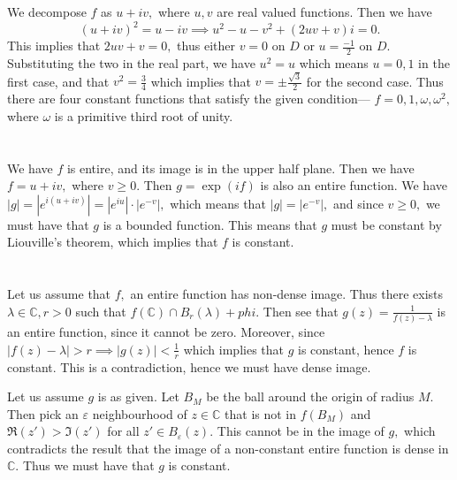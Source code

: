 \documentclass{article}
\begin{document}
\section{} %
We decompose $f$ as $u+iv,$ where $u,v$ are real valued functions. Then we have $$(u+iv)^2=u-iv \implies u^2-u-v^2 + (2uv+v)i =0.$$
This implies that $2uv+v=0,$ thus either $v=0$ on $D$ or $u= \frac{-1}{2}$ on $D.$ Substituting the two in the real part, we have $u^2=u$ which means 
$u=0,1$ in the first case, and that $ v^2=\frac{3}{4}$ which implies that $v = \pm \frac{\sqrt{3}}{2}$ for the second case. 
Thus there are four constant functions that satisfy the given condition--- $f=0, 1, \omega, \omega^2,$ where $\omega$ is a primitive third root of unity. 
\section{} %
We have $f$ is entire, and its image is in the upper half plane. Then we have $f=u+iv,$ where $v \geq 0.$ Then $g=\exp(if)$ is also an entire function. We 
have $|g| = \left| e^{i(u +iv)} \right|= \left| e^{iu} \right| \cdot \left|e^{-v}\right|,$ which means that $|g| = \left|e^{-v}\right|,$ and since $v \geq 
0,$ we must have that $g$ is a bounded function. This means that $g$ must be constant by Liouville's theorem, which implies that $f$ is constant.  
\section{} %
Let us assume that $f,$ an entire function has non-dense image. Thus there exists $\lambda \in \mathbb{C}, r>0$ such that $f(\mathbb{C}) \cap B_r(\lambda) + 
phi.$ Then see that $g(z)= \frac{1}{f(z)-\lambda}$ is an entire function, since it cannot be zero. Moreover, since $|f(z)- \lambda| > r \implies |g(z)|< 
\frac{1}{r} $ which implies that $g$ is constant, hence $f$ is constant. This is a contradiction, hence we must have dense image. 

Let us assume $g$ is as given. Let $B_M$ be the ball around the origin of radius $M.$ Then pick an $\varepsilon$ neighbourhood of $z \in \mathbb{C}$ that is 
not in $f(B_M)$ and $\Re(z') > \Im(z')$ for all $z' \in B_{\varepsilon}(z).$ This cannot be in the image of $g,$ which contradicts the result that the image 
of a non-constant entire function is dense in $\mathbb{C}.$ Thus we must have that $g$ is constant.   
\end{document}
